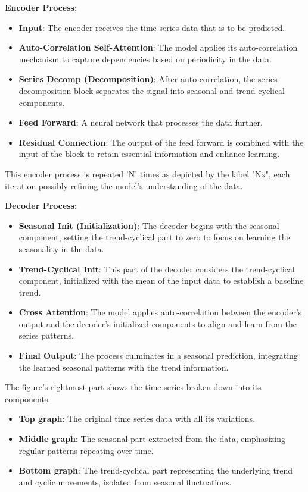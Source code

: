 \documentclass{article}
\begin{document}
\textbf{Encoder Process:}

\begin{itemize}
  \item \textbf{Input}: The encoder receives the time series data that is to be predicted.
  \item \textbf{Auto-Correlation Self-Attention}: The model applies its auto-correlation mechanism to capture dependencies based on periodicity in the data.
  \item \textbf{Series Decomp (Decomposition)}: After auto-correlation, the series decomposition block separates the signal into seasonal and trend-cyclical components.
  \item \textbf{Feed Forward}: A neural network that processes the data further.
  \item \textbf{Residual Connection}: The output of the feed forward is combined with the input of the block to retain essential information and enhance learning.
\end{itemize}

This encoder process is repeated 'N' times as depicted by the label "Nx", each iteration possibly refining the model's understanding of the data.

\textbf{Decoder Process:}

\begin{itemize}
  \item \textbf{Seasonal Init (Initialization)}: The decoder begins with the seasonal component, setting the trend-cyclical part to zero to focus on learning the seasonality in the data.
  \item \textbf{Trend-Cyclical Init}: This part of the decoder considers the trend-cyclical component, initialized with the mean of the input data to establish a baseline trend.
  \item \textbf{Cross Attention}: The model applies auto-correlation between the encoder's output and the decoder's initialized components to align and learn from the series patterns.
  \item \textbf{Final Output}: The process culminates in a seasonal prediction, integrating the learned seasonal patterns with the trend information.
\end{itemize}

The figure's rightmost part shows the time series broken down into its components:

\begin{itemize}
  \item \textbf{Top graph}: The original time series data with all its variations.
  \item \textbf{Middle graph}: The seasonal part extracted from the data, emphasizing regular patterns repeating over time.
  \item \textbf{Bottom graph}: The trend-cyclical part representing the underlying trend and cyclic movements, isolated from seasonal fluctuations.
\end{itemize}
\end{document}
